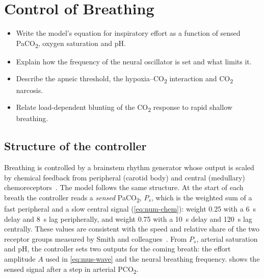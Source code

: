 \chapter{Control of Breathing}
\label{ch:ch08}

\begin{objectives}
\begin{itemize}[leftmargin=*]
  \item Write the model's equation for inspiratory effort as a function of sensed PaCO\textsubscript{2}, oxygen saturation and pH.
  \item Explain how the frequency of the neural oscillator is set and what limits it.
  \item Describe the apneic threshold, the hypoxia--CO\textsubscript{2} interaction and CO\textsubscript{2} narcosis.
  \item Relate load-dependent blunting of the CO\textsubscript{2} response to rapid shallow breathing.
\end{itemize}
\end{objectives}

\section{Structure of the controller}
\label{sec:ctl-structure}
Breathing is controlled by a brainstem rhythm generator whose output is scaled by chemical feedback from peripheral (carotid body) and central (medullary) chemoreceptors~\citep{khoo1982,duffin2000}. The model follows the same structure. At the start of each breath the controller reads a \emph{sensed} PaCO\textsubscript{2}, $P_s$, which is the weighted sum of a fast peripheral and a slow central signal (\cref{eq:num-chem}): weight 0.25 with a \SI{6}{\second} delay and \SI{8}{\second} lag peripherally, and weight 0.75 with a \SI{10}{\second} delay and \SI{120}{\second} lag centrally. These values are consistent with the speed and relative share of the two receptor groups measured by Smith and colleagues~\citep{smith2006}. From $P_s$, arterial saturation and pH, the controller sets two outputs for the coming breath: the effort amplitude $A$ used in \cref{eq:mus-wave} and the neural breathing frequency.  shows the sensed signal after a step in arterial PCO\textsubscript{2}.

